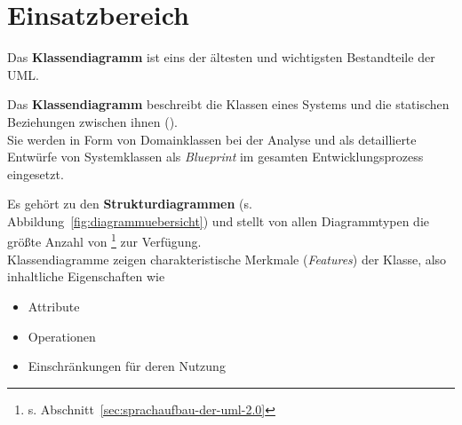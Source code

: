\section{Einsatzbereich}

Das \textbf{Klassendiagramm} ist eins der ältesten und wichtigsten Bestandteile der UML.

\vspace{2mm}
\begin{tcolorbox}
    Das \textbf{Klassendiagramm} beschreibt die Klassen eines Systems und die statischen Beziehungen zwischen ihnen (\cite[17]{Buh09}).\\
    Sie werden in Form von Domainklassen bei der Analyse und als detaillierte Entwürfe von Systemklassen als \textit{Blueprint} im gesamten Entwicklungsprozess eingesetzt.
\end{tcolorbox}
\vspace{2mm}

\noindent
Es gehört zu den \textbf{Strukturdiagrammen} (s. Abbildung~\ref{fig:diagrammuebersicht}) und stellt von allen Diagrammtypen die größte Anzahl von \footnote{s. Abschnitt~\ref{sec:sprachaufbau-der-uml-2.0}} zur Verfügung.\\

\noindent
Klassendiagramme zeigen charakteristische Merkmale (\textit{Features}) der Klasse, also inhaltliche Eigenschaften wie

\begin{itemize}
    \item Attribute
    \item Operationen
    \item Einschränkungen für deren Nutzung
\end{itemize}